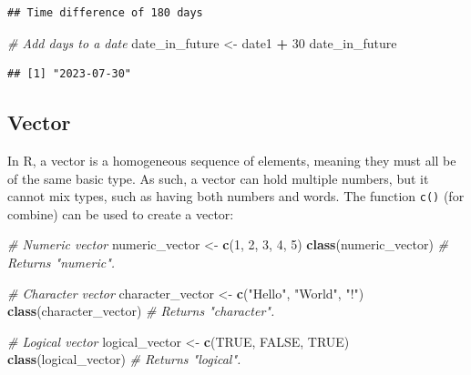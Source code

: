 \documentclass[
]{book}
\newenvironment{Shaded}{\begin{snugshade}}{\end{snugshade}}
\newcommand{\CommentTok}[1]{\textcolor[rgb]{0.56,0.35,0.01}{\textit{#1}}}
\newcommand{\ConstantTok}[1]{\textcolor[rgb]{0.56,0.35,0.01}{#1}}
\newcommand{\DecValTok}[1]{\textcolor[rgb]{0.00,0.00,0.81}{#1}}
\newcommand{\FunctionTok}[1]{\textcolor[rgb]{0.13,0.29,0.53}{\textbf{#1}}}
\newcommand{\NormalTok}[1]{#1}
\newcommand{\OtherTok}[1]{\textcolor[rgb]{0.56,0.35,0.01}{#1}}
\newcommand{\SpecialCharTok}[1]{\textcolor[rgb]{0.81,0.36,0.00}{\textbf{#1}}}
\newcommand{\StringTok}[1]{\textcolor[rgb]{0.31,0.60,0.02}{#1}}
\begin{document}
\begin{verbatim}
## Time difference of 180 days
\end{verbatim}

\begin{Shaded}
\begin{Highlighting}[]
\CommentTok{\# Add days to a date}
\NormalTok{date\_in\_future }\OtherTok{\textless{}{-}}\NormalTok{ date1 }\SpecialCharTok{+} \DecValTok{30}
\NormalTok{date\_in\_future}
\end{Highlighting}
\end{Shaded}

\begin{verbatim}
## [1] "2023-07-30"
\end{verbatim}

\hypertarget{vector}{%
\subsection{Vector}\label{vector}}

In R, a vector is a homogeneous sequence of elements, meaning they must all be of the same basic type. As such, a vector can hold multiple numbers, but it cannot mix types, such as having both numbers and words. The function \texttt{c()} (for combine) can be used to create a vector:

\begin{Shaded}
\begin{Highlighting}[]
\CommentTok{\# Numeric vector}
\NormalTok{numeric\_vector }\OtherTok{\textless{}{-}} \FunctionTok{c}\NormalTok{(}\DecValTok{1}\NormalTok{, }\DecValTok{2}\NormalTok{, }\DecValTok{3}\NormalTok{, }\DecValTok{4}\NormalTok{, }\DecValTok{5}\NormalTok{)}
\FunctionTok{class}\NormalTok{(numeric\_vector)  }\CommentTok{\# Returns "numeric".}

\CommentTok{\# Character vector}
\NormalTok{character\_vector }\OtherTok{\textless{}{-}} \FunctionTok{c}\NormalTok{(}\StringTok{"Hello"}\NormalTok{, }\StringTok{"World"}\NormalTok{, }\StringTok{"!"}\NormalTok{)}
\FunctionTok{class}\NormalTok{(character\_vector)  }\CommentTok{\# Returns "character".}

\CommentTok{\# Logical vector}
\NormalTok{logical\_vector }\OtherTok{\textless{}{-}} \FunctionTok{c}\NormalTok{(}\ConstantTok{TRUE}\NormalTok{, }\ConstantTok{FALSE}\NormalTok{, }\ConstantTok{TRUE}\NormalTok{)}
\FunctionTok{class}\NormalTok{(logical\_vector)  }\CommentTok{\# Returns "logical".}
\end{Highlighting}
\end{Shaded}
\end{document}
